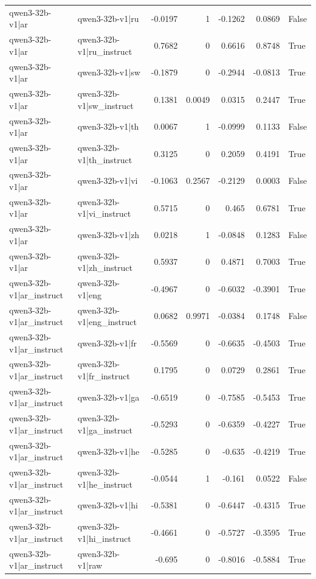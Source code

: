 \begin{table}
\begin{tabular}{l l r r r r l}
qwen3-32b-v1|ar & qwen3-32b-v1|ru & -0.0197 & 1 & -0.1262 & 0.0869 & False \\
qwen3-32b-v1|ar & qwen3-32b-v1|ru_instruct & 0.7682 & 0 & 0.6616 & 0.8748 & True \\
qwen3-32b-v1|ar & qwen3-32b-v1|sw & -0.1879 & 0 & -0.2944 & -0.0813 & True \\
qwen3-32b-v1|ar & qwen3-32b-v1|sw_instruct & 0.1381 & 0.0049 & 0.0315 & 0.2447 & True \\
qwen3-32b-v1|ar & qwen3-32b-v1|th & 0.0067 & 1 & -0.0999 & 0.1133 & False \\
qwen3-32b-v1|ar & qwen3-32b-v1|th_instruct & 0.3125 & 0 & 0.2059 & 0.4191 & True \\
qwen3-32b-v1|ar & qwen3-32b-v1|vi & -0.1063 & 0.2567 & -0.2129 & 0.0003 & False \\
qwen3-32b-v1|ar & qwen3-32b-v1|vi_instruct & 0.5715 & 0 & 0.465 & 0.6781 & True \\
qwen3-32b-v1|ar & qwen3-32b-v1|zh & 0.0218 & 1 & -0.0848 & 0.1283 & False \\
qwen3-32b-v1|ar & qwen3-32b-v1|zh_instruct & 0.5937 & 0 & 0.4871 & 0.7003 & True \\
qwen3-32b-v1|ar_instruct & qwen3-32b-v1|eng & -0.4967 & 0 & -0.6032 & -0.3901 & True \\
qwen3-32b-v1|ar_instruct & qwen3-32b-v1|eng_instruct & 0.0682 & 0.9971 & -0.0384 & 0.1748 & False \\
qwen3-32b-v1|ar_instruct & qwen3-32b-v1|fr & -0.5569 & 0 & -0.6635 & -0.4503 & True \\
qwen3-32b-v1|ar_instruct & qwen3-32b-v1|fr_instruct & 0.1795 & 0 & 0.0729 & 0.2861 & True \\
qwen3-32b-v1|ar_instruct & qwen3-32b-v1|ga & -0.6519 & 0 & -0.7585 & -0.5453 & True \\
qwen3-32b-v1|ar_instruct & qwen3-32b-v1|ga_instruct & -0.5293 & 0 & -0.6359 & -0.4227 & True \\
qwen3-32b-v1|ar_instruct & qwen3-32b-v1|he & -0.5285 & 0 & -0.635 & -0.4219 & True \\
qwen3-32b-v1|ar_instruct & qwen3-32b-v1|he_instruct & -0.0544 & 1 & -0.161 & 0.0522 & False \\
qwen3-32b-v1|ar_instruct & qwen3-32b-v1|hi & -0.5381 & 0 & -0.6447 & -0.4315 & True \\
qwen3-32b-v1|ar_instruct & qwen3-32b-v1|hi_instruct & -0.4661 & 0 & -0.5727 & -0.3595 & True \\
qwen3-32b-v1|ar_instruct & qwen3-32b-v1|raw & -0.695 & 0 & -0.8016 & -0.5884 & True \\

\end{tabular}
\end{table}
